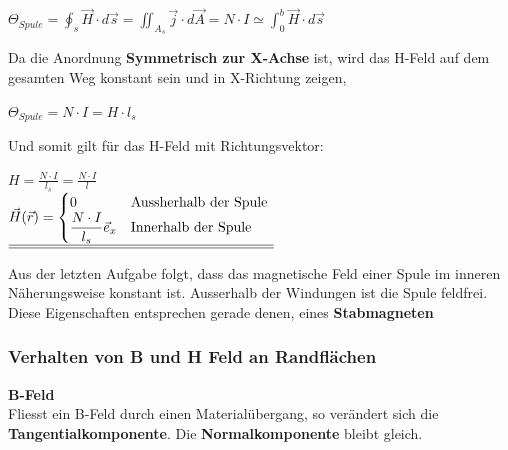 \begin{center}

	$\displaystyle \Theta_{Spule} = \oint_{s} \vec{H} \cdot d\vec{s} = \iint_{A_s} \vec{j} \cdot d\vec{A} = N \cdot I \simeq \int_0^b \vec{H} \cdot d\vec{s}$

	\end{center}
	Da die Anordnung \textbf{Symmetrisch zur X-Achse} ist, wird das H-Feld auf dem gesamten Weg konstant sein und in X-Richtung zeigen,
	\begin{center}

	$ \displaystyle \Theta_{Spule} = N \cdot I = H \cdot l_{s}$

	\end{center}
	Und somit gilt für das H-Feld mit Richtungsvektor:
	\begin{center}

	$\displaystyle H = \frac{N\cdot I}{l_{s}}  = \frac{N\cdot I}{l}$ \\ \fspace
 	$\displaystyle
		\underline{\underline{   \vec{H}(\vec{r}) =
		\begin{cases}
0 & $Aussherhalb der Spule $\\
\displaystyle \frac{N\cdot I}{l_{s}} \vec{e}_x & $Innerhalb der Spule $\\
\end{cases}}}$

	\end{center}
	\iend


	Aus der letzten Aufgabe folgt, dass das magnetische Feld einer Spule im inneren Näherungsweise konstant ist. Ausserhalb der Windungen ist die Spule feldfrei. \\
	Diese Eigenschaften entsprechen gerade denen, eines \textbf{Stabmagneten}


\subsubsection{Verhalten von B und H Feld an Randflächen}
\fix \fix
\textbf{B-Feld} \\
Fliesst ein B-Feld durch einen Materialübergang, so verändert sich die \textbf{Tangentialkomponente}. Die \textbf{Normalkomponente} bleibt gleich.
\begin{center}
\end{center}

